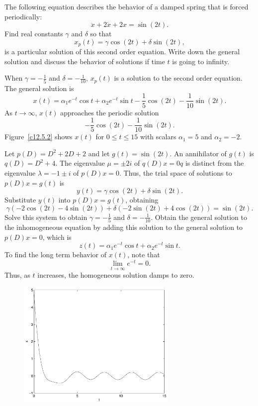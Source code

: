 \documentclass{ximera}
\begin{document}
\begin{exercise} \label{c12.5.2}
The following equation describes the behavior of a damped 
spring that is 
forced periodically:
\[
\ddot x + 2\dot x + 2x = \sin(2t).
\]
Find real constants $\gamma$ and $\delta$ so that
\[
x_p(t) = \gamma \cos(2t)+ \delta \sin(2t),
\]
is a particular solution of this second order equation.  Write down the
general solution and discuss the behavior of solutions if time $t$
is going to infinity.

\begin{solution}
\ans When $\gamma = -\frac{1}{5}$ and $\delta = -\frac{1}{10}$,
$x_p(t)$ is a solution to the second order equation.  The general solution
is
\[
x(t) = \alpha_1e^{-t}\cos t + \alpha_2e^{-t}\sin t
- \frac{1}{5}\cos(2t) - \frac{1}{10}\sin(2t).
\]
As $t \rightarrow \infty$, $x(t)$ approaches the periodic solution
\[
- \frac{1}{5}\cos(2t) - \frac{1}{10}\sin(2t).
\]
Figure~\ref{c12.5.2} shows $x(t)$ for $0 \leq t \leq 15$ with scalars
$\alpha_1 = 5$ and $\alpha_2 = -2$.

\soln Let $p(D) = D^2 + 2D + 2$ and let $g(t) = \sin(2t)$.  An annihilator
of $g(t)$ is $q(D) = D^2 + 4$.  The eigenvalue $\mu = \pm 2i$ of
$q(D)x = 0q$ is distinct from the eigenvalue $\lambda = -1 \pm i$ of
$p(D)x = 0$.  Thus, the trial space of solutions to $p(D)x = g(t)$ is
\[
y(t) = \gamma\cos(2t) + \delta\sin(2t).
\]
Substitute $y(t)$ into $p(D)x = g(t)$, obtaining
\[
\gamma(-2\cos(2t) - 4\sin(2t)) + \delta(-2\sin(2t) + 4\cos(2t)) = \sin(2t).
\]
Solve this system to obtain $\gamma = -\frac{1}{5}$ and
$\delta = -\frac{1}{10}$.  Obtain the general solution to the inhomogeneous
equation by adding this solution to the general solution to $p(D)x = 0$,
which is
\[
z(t) = \alpha_1e^{-t}\cos t + \alpha_2e^{-t}\sin t.
\]
To find the long term behavior of $x(t)$, note that
\[
\lim_{t \rightarrow \infty}e^{-t} = 0.
\]
Thus, as $t$ increases, the homogeneous solution damps to zero. 

\begin{figure}[htb]
                       \centerline{%
                       \includegraphics[width=3.0in]{exfigure/12-5-2.pdf}}
\end{figure}


\end{solution}
\end{exercise}
\end{document}
